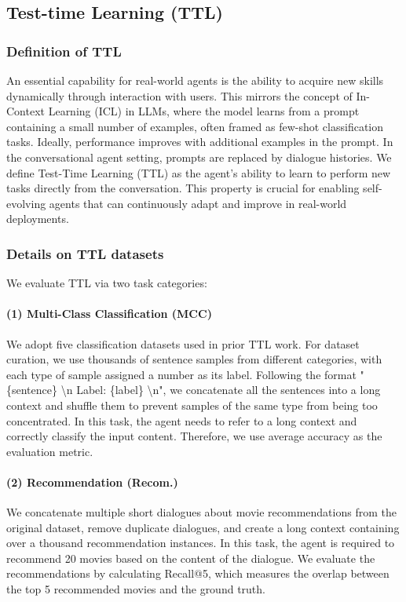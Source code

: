 \subsection{Test-time Learning (TTL)}

\subsubsection{Definition of TTL}

An essential capability for real-world agents is the ability to acquire new skills dynamically through interaction with users. This mirrors the concept of In-Context Learning (ICL) in LLMs, where the model learns from a prompt containing a small number of examples, often framed as few-shot classification tasks. Ideally, performance improves with additional examples in the prompt.
In the conversational agent setting, prompts are replaced by dialogue histories. We define Test-Time Learning (TTL) as the agent’s ability to learn to perform new tasks directly from the conversation. This property is crucial for enabling self-evolving agents that can continuously adapt and improve in real-world deployments.


\subsubsection{Details on TTL datasets}

We evaluate TTL via two task categories:

\paragraph{(1) Multi-Class Classification (MCC)} We adopt five classification datasets used in prior TTL work. For dataset curation, we use thousands of sentence samples from different categories, with each type of sample assigned a number as its label. Following the format "\{sentence\} {\textbackslash n} Label: \{label\} {\textbackslash n}", we concatenate all the sentences into a long context and shuffle them to prevent samples of the same type from being too concentrated. In this task, the agent needs to refer to a long context and correctly classify the input content. Therefore, we use average accuracy as the evaluation metric. 

\paragraph{(2) Recommendation (Recom.)} We concatenate multiple short dialogues about movie recommendations from the original dataset, remove duplicate dialogues, and create a long context containing over a thousand recommendation instances. In this task, the agent is required to recommend 20 movies based on the content of the dialogue. We evaluate the recommendations by calculating Recall@5, which measures the overlap between the top 5 recommended movies and the ground truth. 


